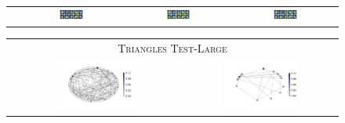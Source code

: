 \begin{figure}[tbh]
\begin{center}
\begin{minipage}{.55\textwidth}
\begin{tabular}{cccc}
			\rotatebox[origin=c]{90}{$\mathbf{\alpha}$} &
			{\includegraphics[width=0.3\textwidth, align=c, trim={4cm 1cm 3cm 1cm}, clip]{cheb_weak_sup/fig_3.pdf}} &
			{\includegraphics[width=0.3\textwidth, align=c, trim={4cm 1cm 3cm 1cm}, clip]{cheb_weak_sup/fig_4.pdf}} &
			{\includegraphics[width=0.3\textwidth, align=c, trim={4cm 1cm 3cm 1cm}, clip]{cheb_weak_sup/fig_5.pdf}} \\
		\end{tabular}
		\end{minipage}
		\begin{minipage}{0.35\textwidth}
		\begin{tabular}{cc}
			\multicolumn{2}{c}{\textsc{Triangles Test-Large}} \rule[-7pt]{0pt}{0pt} \\
			{{\includegraphics[width=0.45\textwidth, align=c, trim={1cm 1cm 2cm 1.5cm}, clip]{cheb_weak_sup_triangles/triangles_test2_large.png}}} &
			{\includegraphics[width=0.5\textwidth, align=c, trim={2cm 1cm 0cm 1.5cm}, clip]{cheb_weak_sup_triangles/triangles_test2_gt_pool_large.pdf}} \\

\end{tabular}
\end{minipage}
\end{center}
\end{figure}
